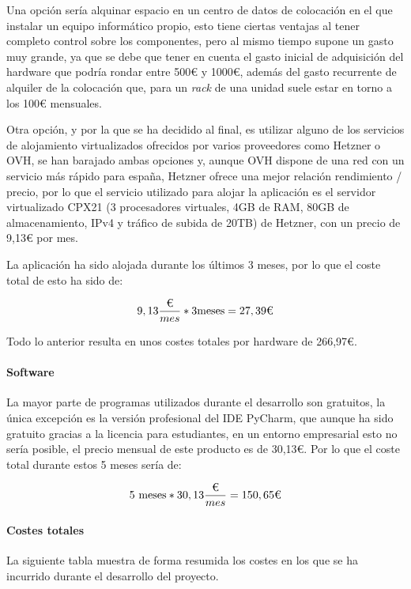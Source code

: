 Una opción sería alquinar espacio en un centro de datos de colocación en el que
instalar un equipo informático propio, esto tiene ciertas ventajas al tener
completo control sobre los componentes, pero al mismo tiempo supone un gasto muy
grande, ya que se debe que tener en cuenta el gasto inicial de adquisición del
hardware que podría rondar entre 500€ y 1000€, además del gasto recurrente de
alquiler de la colocación que, para un \textit{rack} de una unidad suele estar
en torno a los 100€ mensuales.

Otra opción, y por la que se ha decidido al final, es utilizar alguno de los
servicios de alojamiento virtualizados ofrecidos por varios proveedores como
Hetzner o OVH, se han barajado ambas opciones y, aunque OVH dispone de una red
con un servicio más rápido para españa, Hetzner ofrece una mejor relación
rendimiento / precio, por lo que el servicio utilizado para alojar la aplicación
es el servidor virtualizado CPX21 (3 procesadores virtuales, 4GB de RAM, 80GB de
almacenamiento, IPv4 y tráfico de subida de 20TB) de Hetzner, con un precio de
9,13€ por mes.

La aplicación ha sido alojada durante los últimos 3 meses, por lo que el coste
total de esto ha sido de:

$$
9,13 \frac{\textup{€}}{mes} * 3 \text{meses} = 27,39\textup{€}
$$

Todo lo anterior resulta en unos costes totales por hardware de 266,97€.

\paragraph{Software}

La mayor parte de programas utilizados durante el desarrollo son gratuitos, la
única excepción es la versión profesional del IDE PyCharm, que aunque ha sido
gratuito gracias a la licencia para estudiantes, en un entorno empresarial esto
no sería posible, el precio mensual de este producto es de 30,13€. Por lo que el
coste total durante estos 5 meses sería de:

$$
5\text{ meses} * 30,13 \frac{\textup{€}}{mes} = 150,65\textup{€}
$$

\paragraph{Costes totales}

La siguiente tabla muestra de forma resumida los costes en los que se ha
incurrido durante el desarrollo del proyecto.

